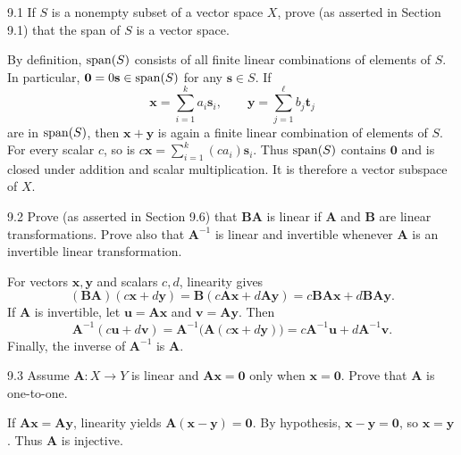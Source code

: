 \documentclass[11pt,oneside]{article}
\begin{document}

\begin{exercise}{9.1}
If $S$ is a nonempty subset of a vector space $X$, prove (as asserted in Section 9.1) that the span of $S$ is a vector space.
\end{exercise}
\begin{solution}
By definition, $\operatorname{span}(S)$ consists of all finite linear combinations of elements of $S$. In particular, $\mathbf 0=0\mathbf s\in\operatorname{span}(S)$ for any $\mathbf s\in S$. If
\[
 \mathbf x=\sum_{i=1}^k a_i\mathbf s_i,\qquad
 \mathbf y=\sum_{j=1}^{\ell}b_j\mathbf t_j
\]
are in $\operatorname{span}(S)$, then $\mathbf x+\mathbf y$ is again a finite linear combination of elements of $S$. For every scalar $c$, so is $c\mathbf x=\sum_{i=1}^k(ca_i)\mathbf s_i$. Thus $\operatorname{span}(S)$ contains $\mathbf 0$ and is closed under addition and scalar multiplication. It is therefore a vector subspace of $X$.
\end{solution}

\begin{exercise}{9.2}
Prove (as asserted in Section 9.6) that $\mathbf B\mathbf A$ is linear if $\mathbf A$ and $\mathbf B$ are linear transformations. Prove also that $\mathbf A^{-1}$ is linear and invertible whenever $\mathbf A$ is an invertible linear transformation.
\end{exercise}
\begin{solution}
For vectors $\mathbf x,\mathbf y$ and scalars $c,d$, linearity gives
\[
 (\mathbf B\mathbf A)(c\mathbf x+d\mathbf y)
 =\mathbf B(c\mathbf A\mathbf x+d\mathbf A\mathbf y)
 =c\mathbf B\mathbf A\mathbf x+d\mathbf B\mathbf A\mathbf y.
\]
If $\mathbf A$ is invertible, let $\mathbf u=\mathbf A\mathbf x$ and $\mathbf v=\mathbf A\mathbf y$. Then
\[
 \mathbf A^{-1}(c\mathbf u+d\mathbf v)
 =\mathbf A^{-1}\bigl(\mathbf A(c\mathbf x+d\mathbf y)\bigr)
 =c\mathbf A^{-1}\mathbf u+d\mathbf A^{-1}\mathbf v.
\]
Finally, the inverse of $\mathbf A^{-1}$ is $\mathbf A$.
\end{solution}

\begin{exercise}{9.3}
Assume $\mathbf A\colon X\to Y$ is linear and $\mathbf A\mathbf x=\mathbf 0$ only when $\mathbf x=\mathbf 0$. Prove that $\mathbf A$ is one-to-one.
\end{exercise}
\begin{solution}
If $\mathbf A\mathbf x=\mathbf A\mathbf y$, linearity yields $\mathbf A(\mathbf x-\mathbf y)=\mathbf 0$. By hypothesis, $\mathbf x-\mathbf y=\mathbf 0$, so $\mathbf x=\mathbf y$. Thus $\mathbf A$ is injective.
\end{solution}
\end{document}
